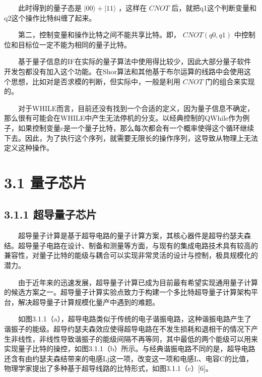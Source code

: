 \documentclass[a4paper,11pt,english]{sphinxmanual}
\begin{document}
\begin{sphinxVerbatim}[commandchars=\\\{\}]
    
     
\end{sphinxVerbatim}

\sphinxAtStartPar
  此时得到的量子态是 \(|00\rangle+|11\rangle\) ，这样在 \(CNOT\) 后，就把q1这个判断变量和q2这个操作比特纠缠了起来。

\sphinxAtStartPar
  第二，控制变量和操作比特之间不能共享比特。即， \(CNOT(q0,q1)\) 中控制位和目标位一定不能为相同的量子比特。

\sphinxAtStartPar
  基于量子信息的IF在实际的量子算法中使用得比较少，因此大部分量子软件开发包都没有加入这个功能。在Shor算法和其他基于布尔运算的线路中会使用这个思想，比如对是否求模的判断，但实际中，一般是利用 \(CNOT\) 门的组合来实现的。

\sphinxAtStartPar
  对于WHILE而言，目前还没有找到一个合适的定义，因为量子信息不确定，那么很有可能会在WHILE中产生无法停机的分支。以经典控制的QWhile作为例子，如果控制变量c是一个量子比特，那么每次都会有一个概率使得这个循环继续下去。因此，为了执行这个序列，就需要无限长的操作序列，这导致从物理上无法定义这种操作。

\sphinxstepscope


\section{3.1 量子芯片}
\label{\detokenize{rst/3.1_u91cf_u5b50_u82af_u7247:id1}}\label{\detokenize{rst/3.1_u91cf_u5b50_u82af_u7247::doc}}

\subsection{3.1.1 超导量子芯片}
\label{\detokenize{rst/3.1_u91cf_u5b50_u82af_u7247:id2}}
\sphinxAtStartPar
  超导量子计算是基于超导电路的量子计算方案，其核心器件是超导约瑟夫森结。超导量子电路在设计、制备和测量等方面，与现有的集成电路技术具有较高的兼容性，对量子比特的能级与耦合可以实现非常灵活的设计与控制，极具规模化的潜力。

\sphinxAtStartPar
  由于近年来的迅速发展，超导量子计算已成为目前最有希望实现通用量子计算的候选方案之一。超导量子计算实验点致力于构建一个多比特超导量子计算架构平台，解决超导量子计算规模化量产中遇到的难题。

\sphinxAtStartPar
  如图3.1.1（a），超导电路类似于传统的电子谐振电路，这种谐振电路产生了谐振子的能级。超导约瑟夫森效应使得超导电路在不发生损耗和退相干的情况下产生非线性，非线性导致谐振子的能级间隔不再等同，其中最低的两个能级可以用来实现量子比特的操控，如图3.1.1（b）所示。与经典谐振电路不同的是，超导电路还含有由约瑟夫森结带来的电感Lj这一项，改变这一项和电感L、电容C的比值，物理学家提出了多种基于超导线路的比特形式，如图3.1.1（c）{[}6{]}。
\end{document}
